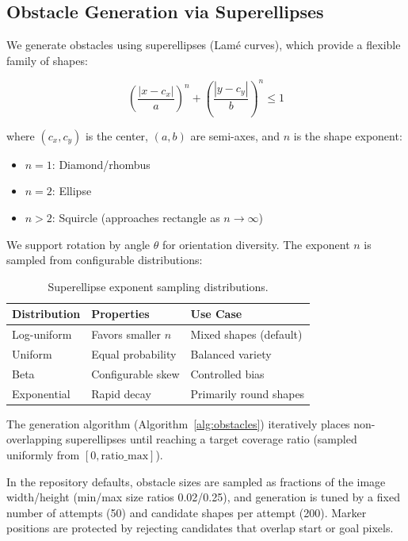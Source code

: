 \documentclass{article}
\begin{document}
\subsection{Obstacle Generation via Superellipses}

We generate obstacles using superellipses (Lamé curves), which provide a flexible family of shapes:

\begin{equation}
\label{eq:superellipse}
\left(\frac{|x - c_x|}{a}\right)^n + \left(\frac{|y - c_y|}{b}\right)^n \leq 1
\end{equation}

where $(c_x, c_y)$ is the center, $(a, b)$ are semi-axes, and $n$ is the shape exponent:
\begin{itemize}[noitemsep]
    \item $n = 1$: Diamond/rhombus
    \item $n = 2$: Ellipse
    \item $n > 2$: Squircle (approaches rectangle as $n \to \infty$)
\end{itemize}

We support rotation by angle $\theta$ for orientation diversity. The exponent $n$ is sampled from configurable distributions:

\begin{table}[h]
\centering
\caption{Superellipse exponent sampling distributions.}
\label{tab:distributions}
\begin{tabular}{lll}
\toprule
Distribution & Properties & Use Case \\
\midrule
Log-uniform & Favors smaller $n$ & Mixed shapes (default) \\
Uniform & Equal probability & Balanced variety \\
Beta & Configurable skew & Controlled bias \\
Exponential & Rapid decay & Primarily round shapes \\
\bottomrule
\end{tabular}
\end{table}

The generation algorithm (Algorithm~\ref{alg:obstacles}) iteratively places non-overlapping superellipses until reaching a target coverage ratio (sampled uniformly from $[0, \text{ratio\_max}]$).

In the repository defaults, obstacle sizes are sampled as fractions of the image width/height (min/max size ratios 0.02/0.25), and generation is tuned by a fixed number of attempts (50) and candidate shapes per attempt (200). Marker positions are protected by rejecting candidates that overlap start or goal pixels.
\end{document}
